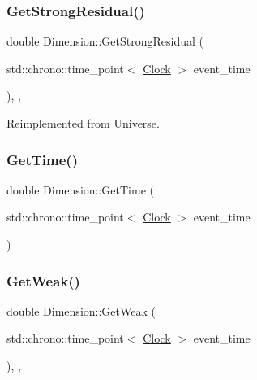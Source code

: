\subsubsection{\texorpdfstring{Get\+Strong\+Residual()}{GetStrongResidual()}}
{\footnotesize\ttfamily double Dimension\+::\+Get\+Strong\+Residual (\begin{DoxyParamCaption}\item[{std\+::chrono\+::time\+\_\+point$<$ \mbox{\hyperlink{universe_8h_a0ef8d951d1ca5ab3cfaf7ab4c7a6fd80}{Clock}} $>$}]{event\+\_\+time }\end{DoxyParamCaption})\hspace{0.3cm}{\ttfamily [inline]}, {\ttfamily [final]}, {\ttfamily [virtual]}}



Reimplemented from \mbox{\hyperlink{classUniverse_af0f4b81950061e63c2855eb40957a5b1}{Universe}}.

\mbox{\label{classDimension_ae0b4f856e62a70bb3dff96528315f3c9}} 
\subsubsection{\texorpdfstring{Get\+Time()}{GetTime()}}
{\footnotesize\ttfamily double Dimension\+::\+Get\+Time (\begin{DoxyParamCaption}\item[{std\+::chrono\+::time\+\_\+point$<$ \mbox{\hyperlink{universe_8h_a0ef8d951d1ca5ab3cfaf7ab4c7a6fd80}{Clock}} $>$}]{event\+\_\+time }\end{DoxyParamCaption})\hspace{0.3cm}{\ttfamily [inline]}}

\mbox{\label{classDimension_a656ce92d07ea600cc0ec53865ad515e2}} 
\subsubsection{\texorpdfstring{Get\+Weak()}{GetWeak()}}
{\footnotesize\ttfamily double Dimension\+::\+Get\+Weak (\begin{DoxyParamCaption}\item[{std\+::chrono\+::time\+\_\+point$<$ \mbox{\hyperlink{universe_8h_a0ef8d951d1ca5ab3cfaf7ab4c7a6fd80}{Clock}} $>$}]{event\+\_\+time }\end{DoxyParamCaption})\hspace{0.3cm}{\ttfamily [inline]}, {\ttfamily [final]}, {\ttfamily [virtual]}}



